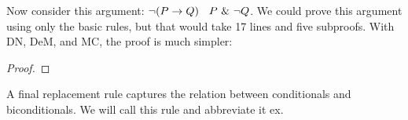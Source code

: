 Now consider this argument: ${\neg}(P \rightarrow Q)$ \therefore\ $P ~\&~ {\neg} Q$. We could prove this argument using only the basic rules, but that would take 17 lines and five subproofs. With DN, DeM, and MC, the proof is much simpler:

\begin{proof}
	 
\end{proof}

A final replacement rule captures the relation between conditionals and biconditionals. We will call this rule  and abbreviate it {\eiff}{ex}.
